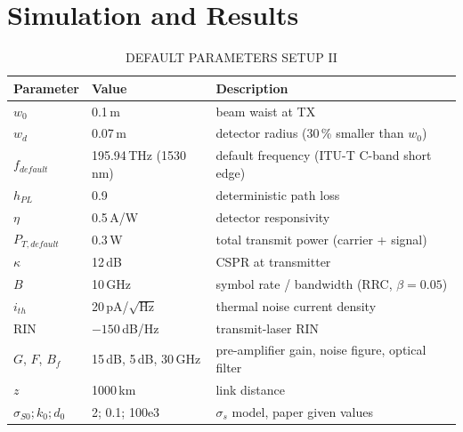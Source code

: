 \section{Simulation and Results}

\begin{table}[h]
\centering
\caption{DEFAULT PARAMETERS SETUP II}
\begin{tabular}{|l|l|l|}
\hline
\textbf{Parameter} & \textbf{Value} & \textbf{Description}\\\hline
$w_0$ & 0.1\,m & beam waist at TX\\\hline
$w_d$ & 0.07\,m & detector radius (30\,\% smaller than $w_0$)\\\hline
$f_{default}$ & 195.94\,THz (1530\,nm) & default frequency (ITU-T C-band short edge)\\\hline
$h_{PL}$ & 0.9 & deterministic path loss\\\hline
$\eta$ & 0.5\,A/W & detector responsivity\\\hline
$P_{T,default}$ & 0.3\,W & total transmit power (carrier + signal)\\\hline
$\kappa$ & 12\,dB & CSPR at transmitter\\\hline
$B$ & 10\,GHz & symbol rate / bandwidth (RRC, $\beta=0.05$)\\\hline
$i_{th}$ & 20\,pA/$\sqrt{\text{Hz}}$ & thermal noise current density\\\hline
RIN & $-150$\,dB/Hz & transmit-laser RIN\\\hline
$G$, $F$, $B_f$ & 15\,dB, 5\,dB, 30\,GHz & pre-amplifier gain, noise figure, optical filter\\\hline
$z$ & 1000\,km & link distance\\\hline
$\sigma_{S0};k_0;d_0$ & 2; 0.1; 100e3 & $\sigma_s$ model, paper given values\\\hline
\end{tabular}
\end{table}

